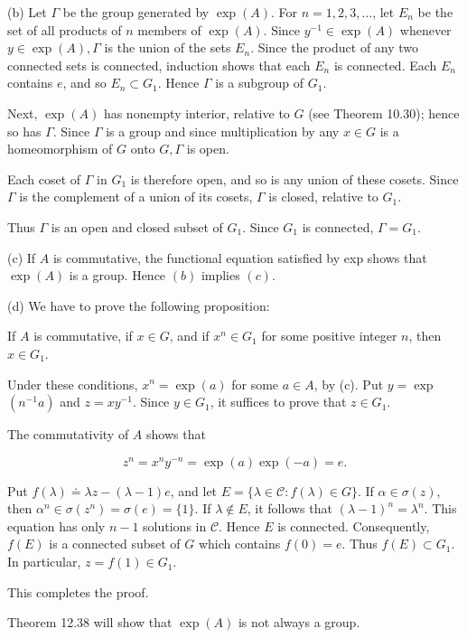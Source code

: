 \documentclass[10pt]{article}
\begin{document}
(b) Let $\Gamma$ be the group generated by $\exp (A)$. For $n=1,2,3, \ldots$, let $E_{n}$ be the set of all products of $n$ members of $\exp (A)$. Since $y^{-1} \in \exp (A)$ whenever $y \in \exp (A), \Gamma$ is the union of the sets $E_{n}$. Since the product of any two connected sets is connected, induction shows that each $E_{n}$ is connected. Each $E_{n}$ contains $e$, and so $E_{n} \subset G_{1}$. Hence $\Gamma$ is a subgroup of $G_{1}$.

Next, $\exp (A)$ has nonempty interior, relative to $G$ (see Theorem 10.30); hence so has $\Gamma$. Since $\Gamma$ is a group and since multiplication by any $x \in G$ is a homeomorphism of $G$ onto $G, \Gamma$ is open.

Each coset of $\Gamma$ in $G_{1}$ is therefore open, and so is any union of these cosets. Since $\Gamma$ is the complement of a union of its cosets, $\Gamma$ is closed, relative to $G_{1}$.

Thus $\Gamma$ is an open and closed subset of $G_{1}$. Since $G_{1}$ is connected, $\Gamma=G_{1}$.

(c) If $A$ is commutative, the functional equation satisfied by exp shows that $\exp (A)$ is a group. Hence $(b)$ implies $(c)$.

(d) We have to prove the following proposition:

If $A$ is commutative, if $x \in G$, and if $x^{n} \in G_{1}$ for some positive integer $n$, then $x \in G_{1}$.

Under these conditions, $x^{n}=\exp (a)$ for some $a \in A$, by (c). Put $y=\exp$ $\left(n^{-1} a\right)$ and $z=x y^{-1}$. Since $y \in G_{1}$, it suffices to prove that $z \in G_{1}$.

The commutativity of $A$ shows that

$$
z^{n}=x^{n} y^{-n}=\exp (a) \exp (-a)=e .
$$

Put $f(\lambda) \doteq \lambda z-(\lambda-1) e$, and let $E=\{\lambda \in \mathscr{C}: f(\lambda) \in G\}$. If $\alpha \in \sigma(z)$, then $\alpha^{n} \in \sigma\left(z^{n}\right)=\sigma(e)=\{1\}$. If $\lambda \notin E$, it follows that $(\lambda-1)^{n}=\lambda^{n}$. This equation has only $n-1$ solutions in $\mathscr{C}$. Hence $E$ is connected. Consequently, $f(E)$ is a connected subset of $G$ which contains $f(0)=e$. Thus $f(E) \subset G_{1}$. In particular, $z=f(1) \in G_{1}$.

This completes the proof.

Theorem 12.38 will show that $\exp (A)$ is not always a group.
\end{document}
